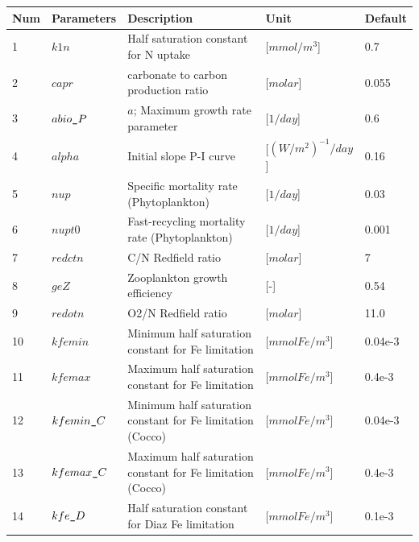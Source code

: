 \documentclass[a4paper]{article}
\begin{document}
\begin{itemize}
{\footnotesize
\begin{longtable}{lllll} \hline
  Num  & Parameters         & Description                                                 & Unit                          & Default    \\ \hline 
   1   & $k1n$              & Half saturation constant for N uptake                       & [$mmol/m^3$]                  & 0.7        \\
   2   & $capr$             & carbonate to carbon production ratio                        & [$molar$]                     & 0.055      \\
   3   & $abio\verb|_|P$    & $a$; Maximum growth rate parameter                          & [$1/day$]                     & 0.6         \\
   4   & $alpha$            & Initial slope P-I curve                                     & [$(W/m^2)^{-1}/day$]          & 0.16        \\
   5   & $nup$              & Specific mortality rate (Phytoplankton)                     & [$1/day$]                     & 0.03        \\
   6   & $nupt0$            & Fast-recycling  mortality rate (Phytoplankton)              & [$1/day$]                     & 0.001       \\
   7   & $redctn$           & C/N Redfield ratio                                          & [$molar$]                     & 7           \\
   8   & $geZ$              & Zooplankton growth efficiency                               & [-]                           & 0.54        \\
   9   & $redotn$           & O2/N Redfield ratio                                         & [$molar$]                     & 11.0        \\
   10  & $kfemin$           & Minimum half saturation constant for Fe limitation          & [$mmol Fe / m^3$]             & 0.04e-3     \\
   11  & $kfemax$           & Maximum half saturation constant for Fe limitation          & [$mmol Fe / m^3$]             & 0.4e-3     \\
   12  & $kfemin\verb|_|C$  & Minimum half saturation constant for Fe limitation (Cocco)  & [$mmol Fe / m^3$]             & 0.04e-3     \\
   13  & $kfemax\verb|_|C$  & Maximum half saturation constant for Fe limitation (Cocco)  & [$mmol Fe / m^3$]             & 0.4e-3     \\
   14  & $kfe\verb|_|D$     & Half saturation constant for Diaz Fe limitation             & [$mmol Fe / m^3$]             & 0.1e-3     \\

\end{longtable}}
\end{itemize}
\end{document}
